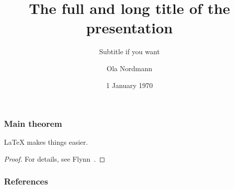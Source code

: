 \documentclass[screen, aspectratio=43]{beamer}
\title[Short title]{The full and long title of the presentation}
\subtitle{Subtitle if you want}
\author[O. Nordmann]{Ola Nordmann}
\institute[NTNU]{Department of \LaTeX-ical sciences, NTNU}
\date{1 January 1970}
\begin{document}
\begin{frame}
  \titlepage
\end{frame}


\begin{frame}
  \frametitle{Main theorem}
  \begin{theorem}
    {\LaTeX} makes things easier.
  \end{theorem}
  \begin{proof}
    For details, see Flynn~\cite{latex}.
  \end{proof}
\end{frame}

\begin{frame}
  \frametitle{References}
  \printbibliography
\end{frame}
\end{document}
